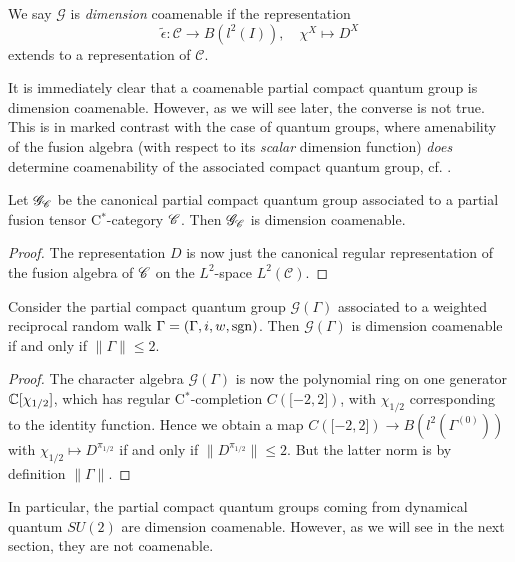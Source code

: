 
\begin{Def} We say $\mathscr{G}$ is \emph{dimension} coamenable %
if the representation \[\tilde{\epsilon}: \mathscr{C} \rightarrow B(l^2(I)), \quad \chi^X \mapsto D^X\] extends to a representation of $\mathcal{C}$.
\end{Def}

It is immediately clear that a coamenable partial compact quantum group is dimension coamenable. However, as we will see later, the converse is not true. This is in marked contrast with the case of quantum groups, where amenability of the fusion algebra (with respect to its \emph{scalar} dimension function) \emph{does} determine coamenability of the associated compact quantum group, cf. \cite[Theorem 4.5]{Kye1}.
 
\begin{Prop} Let $\mathscr{G}_{\mathscr{C}}$ be the canonical partial compact quantum group associated to a partial fusion tensor C$^*$-category $\mathscr{C}$. Then $\mathscr{G}_{\mathscr{C}}$ is dimension coamenable.  
\end{Prop}%
\begin{proof} The representation $D$ is now just the canonical regular representation of the fusion algebra of $\mathscr{C}$ on the $L^2$-space $L^2(\mathcal{C})$. 
 \end{proof}
 
 \begin{Prop} Consider the partial compact quantum group $\mathscr{G}(\Gamma)$ associated to a weighted reciprocal random walk $\Gamma = (\Gamma,i,w,\operatorname{\mathrm{sgn}})$. Then $\mathscr{G}(\Gamma)$ is dimension coamenable if and only if $\|\Gamma\| \leq 2$. 
 \end{Prop}%
 \begin{proof}
 The character algebra $\mathscr{G}(\Gamma)$ is now the polynomial ring on one generator $\mathbb{C}\lbrack \chi_{1/2}\rbrack$, which has regular C$^*$-completion $C(\lbrack -2,2\rbrack)$, with $\chi_{1/2}$ corresponding to the identity function. Hence we obtain a map $C(\lbrack -2,2\rbrack) \rightarrow B(l^2(\Gamma^{(0)}))$ with $\chi_{1/2}\mapsto D^{\pi_{1/2}}$ if and only if $\|D^{\pi_{1/2}}\| \leq  2$. But the latter norm is by definition $\|\Gamma\|$.   
 \end{proof} 
 
 In particular, the partial compact quantum groups coming from dynamical quantum $SU(2)$ are dimension coamenable. However, as we will see in the next section, they are not coamenable.